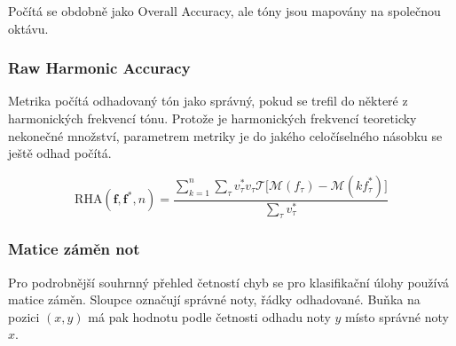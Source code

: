 Počítá se obdobně jako Overall Accuracy, ale tóny jsou mapovány na společnou oktávu.

\subsubsection{Raw Harmonic Accuracy}

Metrika počítá odhadovaný tón jako správný, pokud se trefil do některé z harmonických frekvencí tónu. Protože je harmonických frekvencí teoreticky nekonečné množství, parametrem metriky je do jakého celočíselného násobku se ještě odhad počítá.

    $$\mathrm{RHA}(\mathbf{f}, \mathbf{f^*}, n) = \frac{\sum_{k=1}^n \sum_\tau{v^*_\tau v_\tau \mathcal{T}[\mathcal{M}(f_\tau) - \mathcal{M}(k f^*_\tau)} ] }{\sum_\tau{v^*_\tau}}$$

\subsubsection{Matice záměn not}

Pro podrobnější souhrnný přehled četností chyb se pro klasifikační úlohy používá matice záměn. Sloupce označují správné noty, řádky odhadované. Buňka na pozici $(x,y)$ má pak hodnotu podle četnosti odhadu noty $y$ místo správné noty $x$.






